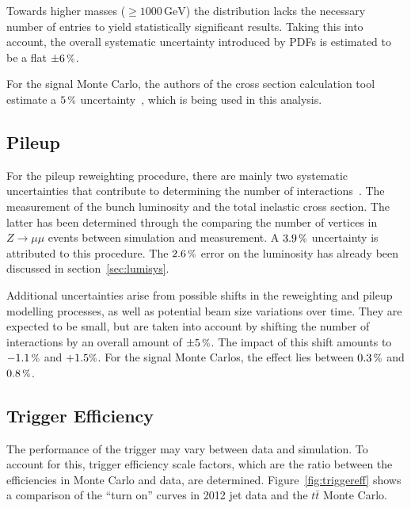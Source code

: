 Towards higher masses ($\geq 1000\,\text{GeV}$) the distribution lacks the necessary number of entries to yield statistically significant results. Taking this into account, the overall systematic uncertainty introduced by PDFs is estimated to be a flat $\pm 6\,\pct$.

For the signal Monte Carlo, the authors of the cross section calculation tool estimate a $5\,\pct$ uncertainty~\cite{susyxstool}, which is being used in this analysis.


\subsection{Pileup}
\label{sec:pusys}

For the pileup reweighting procedure, there are mainly two systematic uncertainties that contribute to determining the number of interactions~\cite{pileupsys}. The measurement of the bunch luminosity and the total inelastic cross section. The latter has been determined through the comparing the number of vertices in $Z \rightarrow \mu\mu$ events between simulation and measurement. A $3.9\,\pct$ uncertainty is attributed to this procedure. The $2.6\,\pct$ error on the luminosity has already been discussed in section~\ref{sec:lumisys}.

Additional uncertainties arise from possible shifts in the reweighting and pileup modelling processes, as well as potential beam size variations over time. They are expected to be small, but are taken into account by shifting the number of interactions by an overall amount of $\pm 5\,\pct$. The impact of this shift amounts to $-1.1\,\pct$ and $+1.5\pct$. For the signal Monte Carlos, the effect lies between $0.3\,\pct$ and $0.8\,\pct$.


\subsection{Trigger Efficiency}
\label{sec:trig-eff}

The performance of the trigger may vary between data and simulation. To account for this, trigger efficiency scale factors, which are the ratio between the efficiencies in Monte Carlo and data, are determined. Figure~\ref{fig:triggereff} shows a comparison of the ``turn on'' curves in 2012 jet data and the $t\bar{t}$ Monte Carlo.

